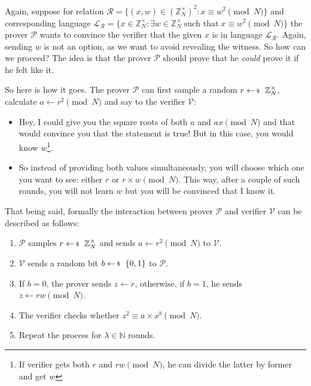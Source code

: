 \documentclass[../../book.tex]{subfiles}
\begin{document}
Again, suppose for relation $\mathcal{R} = \{(x,w) \in (\mathbb{Z}_N^{\times})^2: x \equiv w^2 \pmod{N}\}$ and corresponding language $\mathcal{L}_{\mathcal{R}} = \{x \in \mathbb{Z}_N^{\times}: \exists w \in \mathbb{Z}_N^{\times} \; \text{such that} \; x \equiv w^2 \pmod{N}\}$ the prover $\mathcal{P}$ wants to convince the verifier that the given $x$ is in language $\mathcal{L}_{\mathcal{R}}$. Again, sending $w$ is not an option, as we want to avoid revealing the witness. So how can we proceed? The idea is that the prover $\mathcal{P}$ should prove that he \textit{could} prove it if he felt like it. 

So here is how it goes. The prover $\mathcal{P}$ can first sample a random $r \leftarrowS \mathbb{Z}_N^{\times}$, calculate $a \gets r^2 \pmod{N}$ and say to the verifier $\mathcal{V}$: 
\begin{itemize}
    \item Hey, I could give you the square roots of both $a$ and $ax \pmod{N}$ and that would convince you that the statement is true! But in this case, you would know $w$\footnote{If verifier gets both $r$ and $rw \pmod{N}$, he can divide the latter by former and get $w$}.
    \item So instead of providing both values simultaneously, you will choose which one you want to see: either $r$ or $r\times w\pmod{N}$. This way, after a couple of such rounds, you will not learn $w$ but you will be convinced that I know it.
\end{itemize}

That being said, formally the interaction between prover $\mathcal{P}$ and verifier $\mathcal{V}$ can be described as follows:
\begin{enumerate}
    \item $\mathcal{P}$ samples $r \leftarrowS \mathbb{Z}_N^{\times}$ and sends $a \gets r^2 \pmod{N}$ to $\mathcal{V}$.
    \item $\mathcal{V}$ sends a random bit $b \leftarrowS \{0,1\}$ to $\mathcal{P}$.
    \item If $b=0$, the prover sends $z \gets r$, otherwise, if $b=1$, he sends $z \gets rw \pmod{N}$.
    \item The verifier checks whether $z^2 \equiv a\times x^{b} \pmod{N}$.
    \item Repeat the process for $\lambda \in \mathbb{N}$ rounds.
\end{enumerate}
\end{document}
